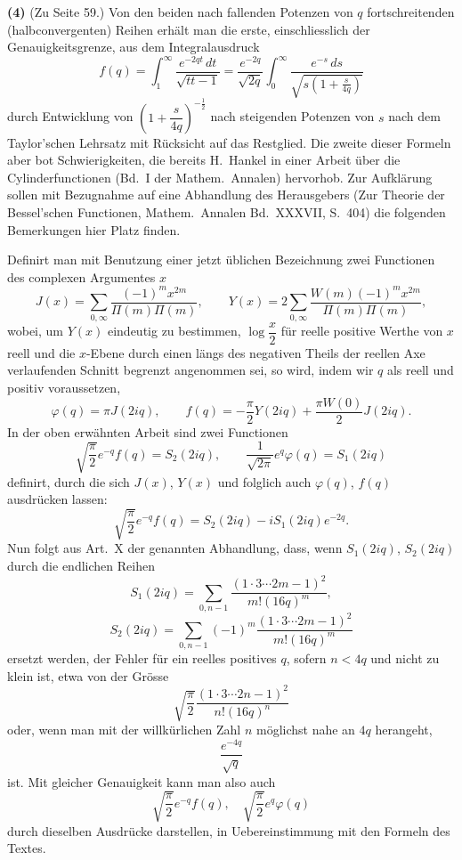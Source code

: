 \documentclass[12pt,a4paper]{article}
\begin{document}
\textbf{(4)} (Zu Seite 59.) Von den beiden nach fallenden Potenzen von $q$ fortschreitenden (halbconvergenten) Reihen erhält man die erste, einschliesslich der Genauigkeitsgrenze, aus dem Integralausdruck
\[
f(q) = \int_1^{\infty} \frac{e^{-2qt}\, dt}{\sqrt{tt-1}} = \frac{e^{-2q}}{\sqrt{2q}} \int_0^{\infty} \frac{e^{-s}\, ds}{\sqrt{s(1+\frac{s}{4q})}}
\]
durch Entwicklung von $\left(1 + \dfrac{s}{4q}\right)^{-\frac{1}{2}}$ nach steigenden Potenzen von $s$ nach dem Taylor'schen Lehrsatz mit Rücksicht auf das Restglied. Die zweite dieser Formeln aber bot Schwierigkeiten, die bereits H.~Hankel in einer Arbeit über die Cylinderfunctionen (Bd.~I der Mathem.\ Annalen) hervorhob. Zur Aufklärung sollen mit Bezugnahme auf eine Abhandlung des Herausgebers (Zur Theorie der Bessel'schen Functionen, Mathem.\ Annalen Bd.~XXXVII, S.~404) die folgenden Bemerkungen hier Platz finden.

Definirt man mit Benutzung einer jetzt üblichen Bezeichnung zwei Functionen des complexen Argumentes $x$
\[
J(x) = \sum_{0,\infty} \frac{(-1)^m x^{2m}}{\Pi(m)\Pi(m)}, \qquad
Y(x) = 2\sum_{0,\infty} \frac{W(m)(-1)^m x^{2m}}{\Pi(m)\Pi(m)},
\]
wobei, um $Y(x)$ eindeutig zu bestimmen, $\log \dfrac{x}{2}$ für reelle positive Werthe von $x$ reell und die $x$-Ebene durch einen längs des negativen Theils der reellen Axe verlaufenden Schnitt begrenzt angenommen sei, so wird, indem wir $q$ als reell und positiv voraussetzen,
\[
\varphi(q) = \pi J(2iq), \qquad f(q) = -\frac{\pi}{2} Y(2iq) + \frac{\pi W(0)}{2} J(2iq).
\]
In der oben erwähnten Arbeit sind zwei Functionen
\[
\sqrt{\frac{\pi}{2}} e^{-q} f(q) = S_2(2iq), \qquad
\frac{1}{\sqrt{2\pi}} e^{q} \varphi(q) = S_1(2iq)
\]
definirt, durch die sich $J(x)$, $Y(x)$ und folglich auch $\varphi(q)$, $f(q)$ ausdrücken lassen:
\[
\sqrt{\frac{\pi}{2}} e^{-q} f(q) = S_2(2iq) - iS_1(2iq) e^{-2q}.
\]
Nun folgt aus Art.~X der genannten Abhandlung, dass, wenn $S_1(2iq)$, $S_2(2iq)$ durch die endlichen Reihen
\[
S_1(2iq) = \sum_{0,n-1} \frac{(1 \cdot 3 \cdots 2m - 1)^2}{m! (16q)^m},
\]
\[
S_2(2iq) = \sum_{0,n-1} (-1)^m \frac{(1 \cdot 3 \cdots 2m - 1)^2}{m! (16q)^m}
\]
ersetzt werden, der Fehler für ein reelles positives $q$, sofern $n < 4q$ und nicht zu klein ist, etwa von der Grösse
\[
\sqrt{\frac{\pi}{2}} \frac{(1 \cdot 3 \cdots 2n - 1)^2}{n! (16q)^n}
\]
oder, wenn man mit der willkürlichen Zahl $n$ möglichst nahe an $4q$ herangeht,
\[
\frac{e^{-4q}}{\sqrt{q}}
\]
ist. Mit gleicher Genauigkeit kann man also auch
\[
\sqrt{\frac{\pi}{2}} e^{-q} f(q), \quad \sqrt{\frac{\pi}{2}} e^{q} \varphi(q)
\]
durch dieselben Ausdrücke darstellen, in Uebereinstimmung mit den Formeln des Textes.
\end{document}

